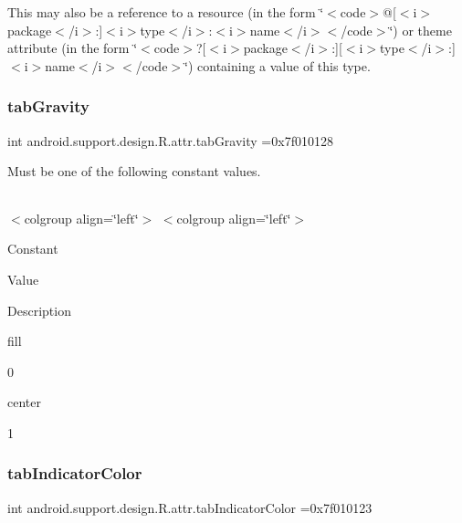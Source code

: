 This may also be a reference to a resource (in the form \char`\"{}$<$code$>$@\mbox{[}$<$i$>$package$<$/i$>$\+:\mbox{]}$<$i$>$type$<$/i$>$\+:$<$i$>$name$<$/i$>$$<$/code$>$\char`\"{}) or theme attribute (in the form \char`\"{}$<$code$>$?\mbox{[}$<$i$>$package$<$/i$>$\+:\mbox{]}\mbox{[}$<$i$>$type$<$/i$>$\+:\mbox{]}$<$i$>$name$<$/i$>$$<$/code$>$\char`\"{}) containing a value of this type. \mbox{\label{classandroid_1_1support_1_1design_1_1R_1_1attr_aa49ae8d39f1825bc91c6650270a48781}} 
\subsubsection{\texorpdfstring{tab\+Gravity}{tabGravity}}
{\footnotesize\ttfamily int android.\+support.\+design.\+R.\+attr.\+tab\+Gravity =0x7f010128\hspace{0.3cm}{\ttfamily [static]}}

Must be one of the following constant values.

\tabulinesep=1mm
\begin{longtabu} spread 0pt [c]{*{0}{|X[-1]}|}
\hline
\end{longtabu}
$<$colgroup align=\char`\"{}left\char`\"{}$>$ $<$colgroup align=\char`\"{}left\char`\"{}$>$ 

Constant

Value

Description 

{\ttfamily fill}

0

{\ttfamily center}

1\mbox{\label{classandroid_1_1support_1_1design_1_1R_1_1attr_a5834056dea54e9c078fdc6ac6b59f3b9}} 
\subsubsection{\texorpdfstring{tab\+Indicator\+Color}{tabIndicatorColor}}
{\footnotesize\ttfamily int android.\+support.\+design.\+R.\+attr.\+tab\+Indicator\+Color =0x7f010123\hspace{0.3cm}{\ttfamily [static]}}

